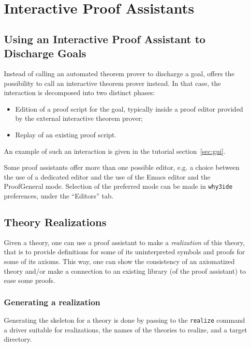 
\chapter{Interactive Proof Assistants}



\section{Using an Interactive Proof Assistant to Discharge Goals}

Instead of calling an automated theorem prover to discharge a goal,
\why offers the possibility to call an interactive theorem prover
instead. In that case, the interaction is decomposed into two distinct
phases:
\begin{itemize}
\item Edition of a proof script for the goal, typically inside a proof editor
  provided by the external interactive theorem prover;
\item Replay of an existing proof script.
\end{itemize}
An example of such an interaction is given in the tutorial
section~\ref{sec:gui}.

Some proof assistants offer more than one possible editor, e.g. a
choice between the use of a dedicated editor and the use of the Emacs
editor and the ProofGeneral mode. Selection of the preferred mode can
be made in \texttt{why3ide} preferences, under the ``Editors'' tab.

\section{Theory Realizations}
\label{sec:realizations}

Given a \why theory, one can use a proof assistant to make a
\emph{realization} of this theory, that is to provide definitions for
some of its uninterpreted symbols and proofs for some of its
axioms. This way, one can show the consistency of an axiomatized
theory and/or make a connection to an existing library (of the proof
assistant) to ease some proofs.

\subsection{Generating a realization}

Generating the skeleton for a theory is done by passing to the
\texttt{realize} command a driver suitable for realizations, the names of
the theories to realize, and a target directory.

